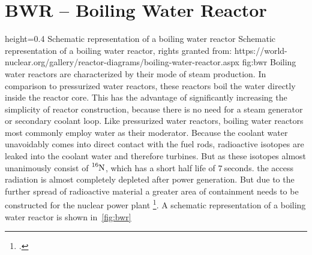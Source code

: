 \section{BWR – Boiling Water Reactor}
    {height=0.4\textheight}
    {Schematic representation of a boiling water reactor}
    {Schematic representation of a boiling water reactor, rights granted from: https://world-nuclear.org/gallery/reactor-diagrams/boiling-water-reactor.aspx}
    {fig:bwr}
Boiling water reactors are characterized by their mode of steam production. In comparison to pressurized
water reactors, these reactors boil the water directly inside the reactor core. This has the advantage
of significantly increasing the simplicity of reactor construction, because there is no need for a steam
generator or secondary coolant loop. Like pressurized water reactors, boiling water reactors most commonly
employ water as their moderator. Because the coolant water unavoidably comes into direct contact with
the fuel rods, radioactive isotopes are leaked into the coolant water and therefore turbines. But 
as these isotopes almost unanimously consist of $\ce{^{16}N}$, which has a short half life of $7~$seconds.
the access radiation is almost completely depleted after power generation. But due to the further
spread of radioactive material a greater area of containment needs to be constructed for the nuclear
power plant \footcite[85-140]{engHandbook}. A schematic representation of a boiling water reactor
is shown in~\ref{fig:bwr}
\pagebreak
